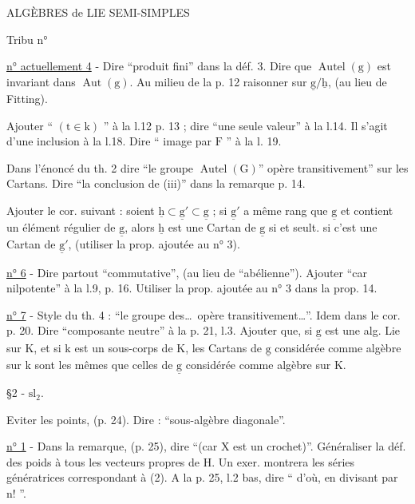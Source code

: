 ALGÈBRES de LIE SEMI-SIMPLES 

Tribu n° 

\uline{n° actuellement 4} - Dire ``produit fini'' dans la déf. 3. Dire que $\operatorname{Autel}(\mathrm{g})$ est invariant dans $\operatorname{Aut}(\mathrm{g})$. Au milieu de la p. 12 raisonner sur $\underline{\mathrm{g}}/\underline{\mathrm{h}}$, (au lieu de Fitting).

Ajouter `` $(\mathrm{t}\in\mathrm{k})$ '' à la l.12 p. 13 ; dire ``une seule valeur'' à la l.14. Il s'agit d'une inclusion à la l.18. Dire `` image par $\mathrm{F}$ '' à la l. 19.

Dans l'énoncé du th. 2 dire ``le groupe $\operatorname{Autel}(\mathrm{G})$'' opère transitivement'' sur les Cartans. Dire ``la conclusion de (iii)'' dans la remarque p. 14.

Ajouter le cor. suivant : soient $\underline{\mathrm{h}}\subset\underline{\mathrm{g}}'\subset\underline{\mathrm{g}}$ ; si $\underline{\mathrm{g}}'$ a même rang que $\underline{\mathrm{g}}$ et contient un élément régulier de $\underline{\mathrm{g}}$, alors $\underline{\mathrm{h}}$ est une Cartan de $\underline{\mathrm{g}}$ si et seult. si c'est une Cartan de $\underline{\mathrm{g}}'$, (utiliser la prop. ajoutée au n° 3).

\uline{n° 6} - Dire partout ``commutative'', (au lieu de ``abélienne''). Ajouter ``car nilpotente'' à la l.9, p. 16. Utiliser la prop. ajoutée au n° 3 dans la prop. 14.

\uline{n° 7} - Style du th. 4 : ``le groupe des\ldots\ opère transitivement\ldots''. Idem dans le cor. p. 20. Dire ``composante neutre'' à la p. 21, l.3. Ajouter que, si $\underline{\mathrm{g}}$ est une alg. Lie sur $\mathrm{K}$, et si $\mathrm{k}$ est un sous-corps de $\mathrm{K}$, les Cartans de $\underline{\mathrm{g}}$ considérée comme algèbre sur $\mathrm{k}$ sont les mêmes que celles de $\underline{\mathrm{g}}$ considérée comme algèbre sur $\mathrm{K}$.

\S2 -  $\mathrm{sl}_2$.

Eviter les points, (p. 24). Dire : ``sous-algèbre diagonale''.

\uline{n° 1} - Dans la remarque, (p. 25), dire ``(car $\mathrm{X}$ est un crochet)''. Généraliser la déf. des poids à tous les vecteurs propres de $\mathrm{H}$. Un exer. montrera les séries génératrices correspondant à (2). A la p. 25, l.2 bas, dire `` d'où, en divisant par $\mathrm{n}!$ ''.

